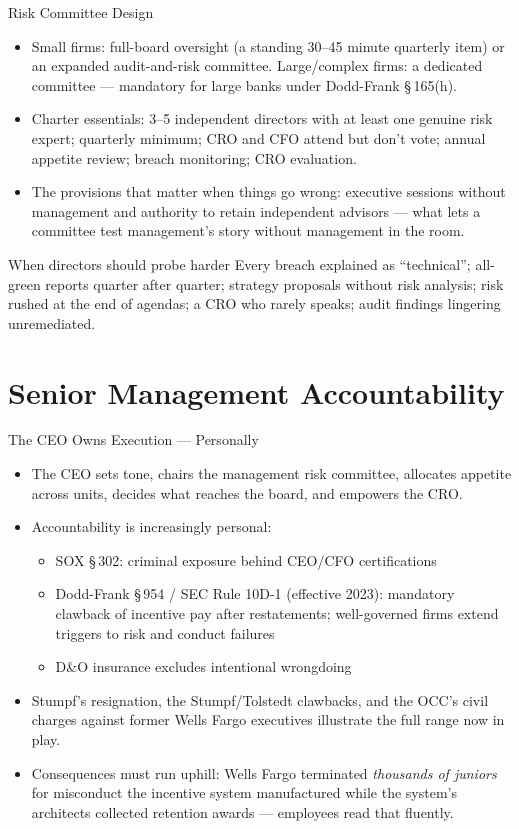 \documentclass[11pt, aspectratio=169]{beamer}
\begin{document}
\begin{frame}{Risk Committee Design}
\begin{itemize}
  \item Small firms: full-board oversight (a standing 30--45 minute quarterly item) or an expanded audit-and-risk committee. Large/complex firms: a dedicated committee --- \alert{mandatory} for large banks under Dodd-Frank \S\,165(h).
  \item Charter essentials: 3--5 independent directors with at least one genuine risk expert; quarterly minimum; CRO and CFO attend but don't vote; annual appetite review; breach monitoring; CRO evaluation.
  \item The provisions that matter when things go wrong: \alert{executive sessions without management} and \alert{authority to retain independent advisors} --- what lets a committee test management's story without management in the room.
\end{itemize}
\medskip
\begin{block}{When directors should probe harder}
Every breach explained as ``technical''; all-green reports quarter after quarter; strategy proposals without risk analysis; risk rushed at the end of agendas; a CRO who rarely speaks; audit findings lingering unremediated.
\end{block}
\end{frame}

\section{Senior Management Accountability}

\begin{frame}{The CEO Owns Execution --- Personally}
\begin{itemize}
  \item The CEO sets tone, chairs the management risk committee, allocates appetite across units, decides what reaches the board, and empowers the CRO.
  \item Accountability is increasingly personal:
  \begin{itemize}
    \item SOX \S\,302: criminal exposure behind CEO/CFO certifications
    \item Dodd-Frank \S\,954 / \alert{SEC Rule 10D-1} (effective 2023): mandatory clawback of incentive pay after restatements; well-governed firms extend triggers to risk and conduct failures
    \item D\&O insurance excludes intentional wrongdoing
  \end{itemize}
  \item Stumpf's resignation, the Stumpf/Tolstedt clawbacks, and the OCC's civil charges against former Wells Fargo executives illustrate the full range now in play.
  \item Consequences must run uphill: Wells Fargo terminated \emph{thousands of juniors} for misconduct the incentive system manufactured while the system's architects collected retention awards --- employees read that fluently.
\end{itemize}
\end{frame}
\end{document}
